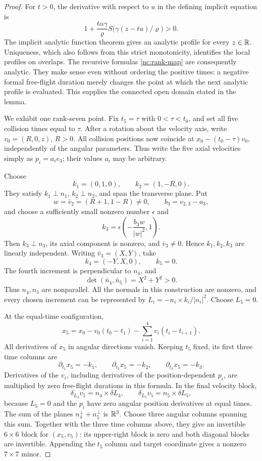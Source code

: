 \begin{proof}
For \(t>0\), the derivative with respect to \(u\) in the defining
implicit equation is
\[
 1+\frac{t\alpha\gamma}{\varrho}
 S\bigl(\gamma(z-tu)/\varrho\bigr)>0.
\]
The implicit analytic function theorem gives an analytic profile
for every \(z\in\mathbb R\).  Uniqueness, which also follows from this
strict monotonicity, identifies the local profiles on overlaps.
The recursive formulas \eqref{nc:rank-map} are consequently
analytic.  They make sense even without ordering the positive
times: a negative formal free-flight duration merely changes
the point at which the next analytic profile is evaluated.
This supplies the connected open domain stated in the lemma.

We exhibit one rank-seven point.  Fix \(t_5=\tau\) with
\(0<\tau<t_0\), and set all five collision times equal to
\(\tau\).  After a rotation about the velocity axis, write
\(v_0=(R,0,z)\), \(R>0\).  All collision positions now coincide
at \(x_0-(t_0-\tau)v_0\), independently of the angular parameters.
Thus write the five axial velocities simply as \(p_i=a_i e_3\);
their values \(a_i\) may be arbitrary.

Choose
\[
 k_1=(0,1,0),\qquad k_2=(1,-R,0).
\]
They satisfy \(k_1\perp n_1\), \(k_2\perp n_2\), and span the
transverse plane.  Put
\[
 w=\bar v_2=(R+1,1-R)\ne0,\qquad b_3=v_{2,3}-a_3,
\]
and choose a sufficiently small nonzero number \(\epsilon\) and
\[
 k_3=\epsilon\left(-\frac{b_3w}{|w|^2},1\right).
\]
Then \(k_3\perp n_3\), its axial component is nonzero, and
\(\bar v_3\ne0\).  Hence \(k_1,k_2,k_3\) are linearly independent.
Writing \(\bar v_3=(X,Y)\), take
\[
 k_4=(-Y,X,0),\qquad k_5=0.
\]
The fourth increment is perpendicular to \(n_4\), and
\[
 \det(\bar n_4,\bar n_5)=X^2+Y^2>0.
\]
Thus \(n_4,n_5\) are nonparallel.  All the normals in this
construction are nonzero, and every chosen increment can be
represented by \(L_i=-n_i\times k_i/|n_i|^2\).  Choose \(L_5=0\).

At the equal-time configuration,
\[
 x_5=x_0-v_0(t_0-t_1)
           -\sum_{i=1}^4v_i(t_i-t_{i+1}).
\]
All derivatives of \(x_5\) in angular directions vanish.
Keeping \(t_5\) fixed, its first three time columns are
\[
 \partial_{t_1}x_5=-k_1,\qquad
 \partial_{t_2}x_5=-k_2,\qquad
 \partial_{t_3}x_5=-k_3.
\]
Derivatives of the \(v_i\), including derivatives of the
position-dependent \(p_i\), are multiplied by zero free-flight
durations in this formula.  In the final velocity block,
\[
 \delta_{L_4}v_5=n_4\times\delta L_4,\qquad
 \delta_{L_5}v_5=n_5\times\delta L_5,
\]
because \(L_5=0\) and the \(p_i\) have zero angular position
derivatives at equal times.  The sum of the planes
\(n_4^\perp+n_5^\perp\) is \(\mathbb R^3\).  Choose three angular
columns spanning this sum.  Together with the three time columns
above, they give an invertible \(6\times6\) block for
\((x_5,v_5)\): its upper-right block is zero and both diagonal
blocks are invertible.  Appending the \(t_5\) column and target
coordinate gives a nonzero \(7\times7\) minor.


\end{proof}
